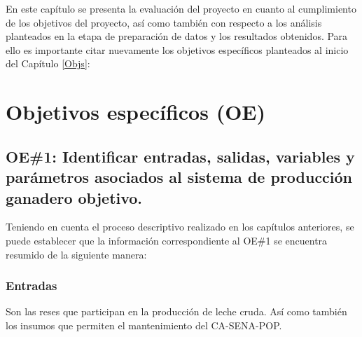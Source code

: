 

En este capítulo se presenta la evaluación del proyecto en cuanto al cumplimiento de los objetivos del proyecto, así como también con respecto a los análisis planteados en la etapa de preparación de datos y los resultados obtenidos. Para ello es importante citar nuevamente los objetivos específicos planteados al inicio del Capítulo \ref{Objs}:

\section{Objetivos específicos (OE)}\label{objesp}
\subsection{OE\#1: Identificar entradas, salidas, variables y parámetros asociados al sistema de producción ganadero objetivo.}

Teniendo en cuenta el proceso descriptivo realizado en los capítulos anteriores, se puede establecer que la información correspondiente al OE\#1 se encuentra resumido de la siguiente manera:

\subsubsection{Entradas}
Son las reses que participan en la producción de leche cruda. Así como también los insumos  que permiten el mantenimiento del CA-SENA-POP.

